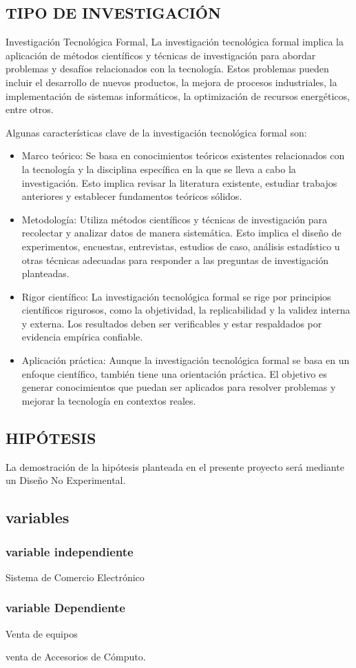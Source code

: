 \documentclass[12pt,a4paper]{article}
\newcommand{\espacio}{\par\vspace{3mm}}
\newcommand{\newsubsection}[1]{\subsection{\hspace{4mm} #1}}
\begin{document}
\newsubsection{TIPO DE INVESTIGACIÓN}
Investigación Tecnológica Formal, La investigación tecnológica formal implica la aplicación de métodos científicos y técnicas de investigación para abordar problemas y desafíos relacionados con la tecnología. Estos problemas pueden incluir el desarrollo de nuevos productos, la mejora de procesos industriales, la implementación de sistemas informáticos, la optimización de recursos energéticos, entre otros.
\espacio
Algunas características clave de la investigación tecnológica formal son:
\begin{itemize}
    \item Marco teórico: Se basa en conocimientos teóricos existentes relacionados con la tecnología y la disciplina específica en la que se lleva a cabo la investigación. Esto implica revisar la literatura existente, estudiar trabajos anteriores y establecer fundamentos teóricos sólidos.
    \item Metodología: Utiliza métodos científicos y técnicas de investigación para recolectar y analizar datos de manera sistemática. Esto implica el diseño de experimentos, encuestas, entrevistas, estudios de caso, análisis estadístico u otras técnicas adecuadas para responder a las preguntas de investigación planteadas.
    \item Rigor científico: La investigación tecnológica formal se rige por principios científicos rigurosos, como la objetividad, la replicabilidad y la validez interna y externa. Los resultados deben ser verificables y estar respaldados por evidencia empírica confiable.
    \item Aplicación práctica: Aunque la investigación tecnológica formal se basa en un enfoque científico, también tiene una orientación práctica. El objetivo es generar conocimientos que puedan ser aplicados para resolver problemas y mejorar la tecnología en contextos reales.
\end{itemize}
\newsubsection{HIPÓTESIS}
La demostración de la hipótesis planteada en el presente proyecto será mediante un Diseño No Experimental.
\newsubsection{variables}
\subsubsection*{variable independiente}
Sistema de Comercio Electrónico
\subsubsection*{variable Dependiente}
Venta de equipos \par
venta de Accesorios de Cómputo.
\end{document}
